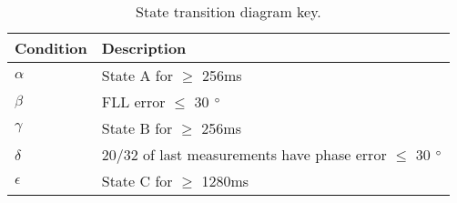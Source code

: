 \begin{table}[!htb]
\centering
\begin{tabular}{|l|l|}
\hline
\rowcolor[HTML]{C0C0C0} 
Condition & Description                                                 \\ \hline
$\alpha$    & State A for  $\geq$ 256ms                                     \\ \hline
\rowcolor[HTML]{EFEFEF} 
$\beta$     & FLL error $\leq$ 30 $\degree$                                  \\ \hline
$\gamma$    & State B for $\geq$ 256ms                                      \\ \hline
\rowcolor[HTML]{EFEFEF} 
$\delta$    & 20/32 of last measurements have phase error $\leq$ 30 $\degree$ \\ \hline
$\epsilon$  & State C for $\geq$ 1280ms                                      \\ \hline
\end{tabular}
\caption{State transition diagram key.}
\label{tab:StateTransitionDiagramKey}
\end{table}